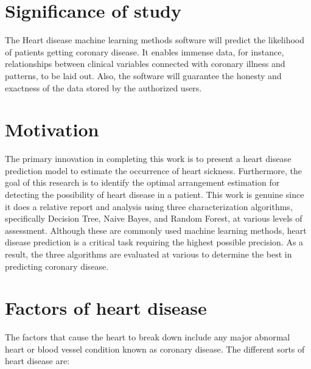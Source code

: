 \section{Significance of study}
The Heart disease machine learning methods software will predict the likelihood of patients getting coronary disease. It enables immense data, for instance, relationships between clinical variables connected with coronary illness and patterns, to be laid out. Also, the software will guarantee the honesty and exactness of the data stored by the authorized users. 

\section{Motivation}
The primary innovation in completing this work is to present a heart disease prediction model to estimate the occurrence of heart sickness. Furthermore, the goal of this research is to identify the optimal arrangement estimation for detecting the possibility of heart disease in a patient. This work is genuine since it does a relative report and analysis using three characterization algorithms, specifically Decision Tree, Naive Bayes, and Random Forest, at various levels of assessment. Although these are commonly used machine learning methods, heart disease prediction is a critical task requiring the highest possible precision. As a result, the three algorithms are evaluated at various to determine the best in predicting coronary disease.

\section{Factors of heart disease}

The factors that cause the heart to break down include any major abnormal heart or blood vessel condition known as coronary disease. The different sorts of heart disease are:

